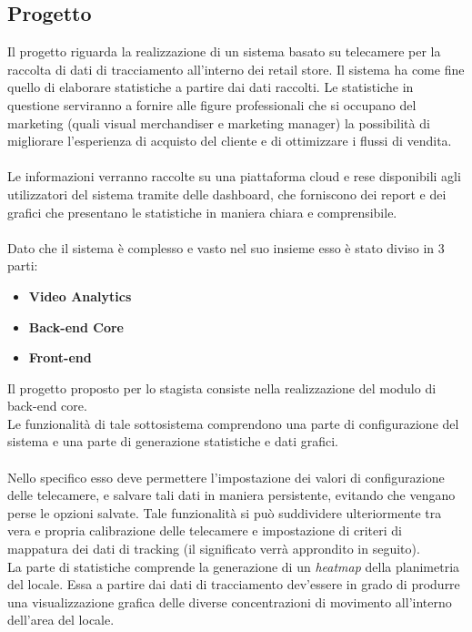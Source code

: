 \subsection{Progetto} \label{ssec:progetto}
Il progetto riguarda la realizzazione di un sistema basato su telecamere per la raccolta di dati di tracciamento all'interno dei retail store. Il sistema ha come fine quello di elaborare statistiche a partire dai dati raccolti. Le statistiche in questione serviranno a fornire alle figure professionali che si occupano del marketing (quali visual merchandiser e marketing manager) la possibilità di migliorare l'esperienza di acquisto del cliente e di ottimizzare i flussi di vendita.\\ \\
Le informazioni verranno raccolte su una piattaforma cloud e rese disponibili agli utilizzatori del sistema tramite delle dashboard, che forniscono dei report e dei grafici che presentano le statistiche in maniera chiara e comprensibile. \\ \\
Dato che il sistema è complesso e vasto nel suo insieme esso è stato diviso in 3 parti:
\begin{itemize}
	\item \textbf{Video Analytics}
	\item \textbf{Back-end Core}
	\item \textbf{Front-end}
\end{itemize}
Il progetto proposto per lo stagista consiste nella realizzazione del modulo di back-end core.\\
Le funzionalità di tale sottosistema comprendono una parte di configurazione del sistema e una parte di generazione statistiche e dati grafici. \\ \\
Nello specifico esso deve permettere l'impostazione dei valori di configurazione delle telecamere, e salvare tali dati in maniera persistente, evitando che vengano perse le opzioni salvate. Tale funzionalità si può suddividere ulteriormente tra vera e propria calibrazione delle telecamere e impostazione di criteri di mappatura dei dati di tracking (il significato verrà approndito in seguito). \\
La parte di statistiche comprende la generazione di un \textit{heatmap} della planimetria del locale. Essa a partire dai dati di tracciamento dev'essere in grado di produrre una visualizzazione grafica delle diverse concentrazioni di movimento all'interno dell'area del locale.\\
